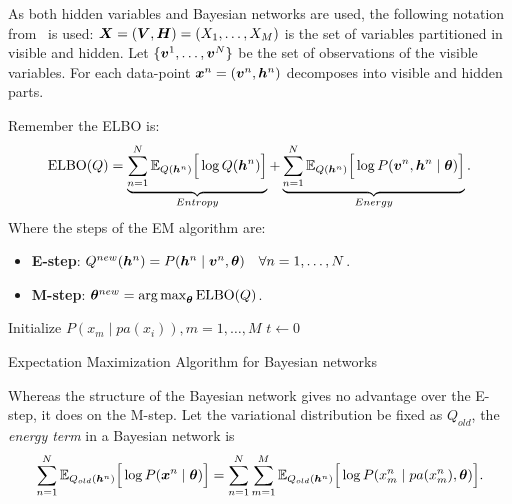 As both hidden variables and Bayesian networks are used, the following notation from~\cite{barber} is used: \(\bm{X} = (\bm{V}, \bm{H}) = (X_{1}, \dots , X_{M})\) is the set of variables partitioned in visible and hidden. Let \(\{\bm{v}^{1}, \dots, \bm{v}^{N}\}\) be the set of observations of the visible variables. For each data-point \(\bm{x}^{n} = (\bm{v}^{n}, \bm{h}^{n})\) decomposes into visible and hidden parts.

Remember the ELBO is:
\[
  \text{ELBO}(Q) = \underbrace{\sum_{n=1}^{N}\mathbb{E}_{Q(\bm{h}^{n})}\Big[\log{Q(\bm{h}^{n})}\Big]}_{Entropy} + \underbrace{\sum_{n=1}^{N}\mathbb{E}_{Q(\bm{h}^{n})}\Big[\log{P(\bm{v}^{n}, \bm{h}^{n} \mid \bm{\theta})}\Big]}_{Energy}.
\]
Where the steps of the EM algorithm are:
\begin{itemize}
  \item \textbf{E-step}:  \(Q^{new}(\bm{h}^{n}) = P(\bm{h}^{n} \mid \bm{v}^{n} , \bm{\theta}) \quad \forall n=1,\dots,N\).
  \item \textbf{M-step}: \(\bm{\theta}^{new} = \operatorname*{arg\,max}_{\bm{\theta}} \text{ELBO}(Q)\).
\end{itemize}

\begin{algorithm}[t]
  \SetAlgoLined{}
  Initialize \( P(x_{m}\mid pa(x_{i})), m=1,\dots,M \)\;
  \(t \leftarrow 0\)\;
  \;
  \caption{Expectation Maximization Algorithm for Bayesian networks}\label{alg:em_bn}
\end{algorithm}


Whereas the structure of the Bayesian network gives no advantage over the E-step, it does on the M-step. Let the variational distribution be fixed as \(Q_{old}\), the \emph{energy term} in a Bayesian network is
\[
  \sum_{n=1}^{N} \mathbb{E}_{Q_{old}(\bm{h}^{n})}\Big[ \log{P(\bm{x}^{n} \mid \bm{\theta})} \Big] = \sum_{n = 1}^{N}\sum_{m = 1}^{M} \mathbb{E}_{Q_{old}(\bm{h}^{n})}\Big[\log{P( x_{m}^{n} \mid pa(x_{m}^{n}), \bm{\theta})}\Big].
\]

